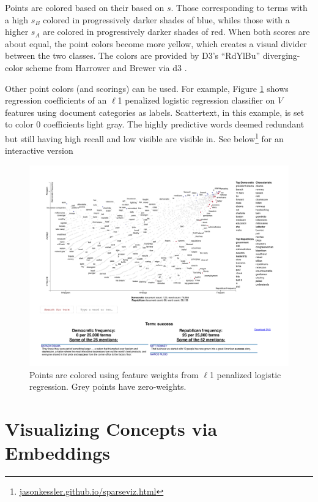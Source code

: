 \documentclass[11pt,a4paper]{article}
\begin{document}
Points are colored based on their based on $s$.  Those corresponding to terms with a high $s_B$ colored in progressively darker shades of blue, whiles those with a higher $s_A$ are colored in progressively darker shades of red.  When both scores are about equal, the point colors become more yellow, which creates a visual divider between the two classes.   The colors are provided by D3's ``RdYlBu'' diverging-color scheme from Harrower and Brewer \cite{colorbrewer} via d3 \cite{d3}.

Other point colors (and scorings) can be used.  For example, Figure \ref{scattertextsparse} shows regression coefficients of an $\ell$1 penalized logistic regression classifier on $V$ features using document categories as labels.  Scattertext, in this example, is set to color 0 coefficients light gray.  The highly predictive words deemed redundant but still having high recall and low visible are visible in.  See below\footnote{
\href{https://jasonkessler.github.io/sparseviz.html}{jasonkessler.github.io/sparseviz.html}} for an interactive version

\begin{figure}[h]
  \includegraphics[width=\linewidth]{sparse_scattertext}
  \caption{Points are colored using feature weights from $\ell$1 penalized logistic regression.  Grey points have zero-weights.}
  \label{scattertextsparse}
\end{figure}

\vspace{-.25cm}
\section{Visualizing Concepts via Embeddings}
\label{embeddings}
\end{document}
